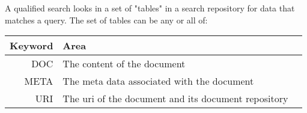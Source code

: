 A qualified search looks in a set of "tables" in a search repository for data that matches a query. The set of tables can
be any or all of:

\begin{table}[H]
\small
\begin{center}
\begin{tabular}{r l p{8cm}}
  Keyword & Area \\
  \hline
  DOC & The content of the document \\
  META & The meta data associated with the document \\
  URI & The uri of the document and its document repository \\
\end{tabular}
\end{center}
\end{table}
